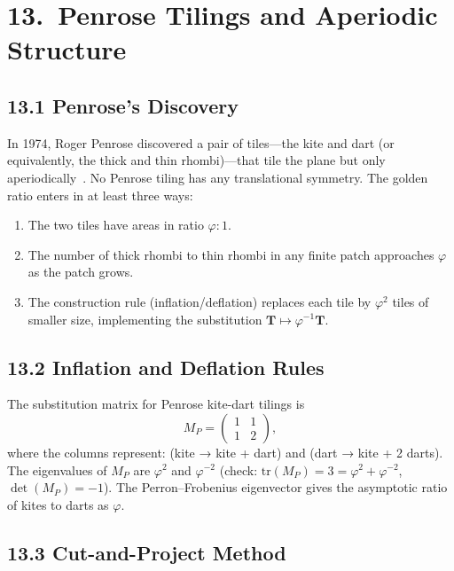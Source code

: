 \section{13.\ Penrose Tilings and Aperiodic Structure}
\label{sec:gc-penrose}

\subsection{13.1 Penrose's Discovery}
\label{subsec:gc-penrose-discovery}

In 1974, Roger Penrose discovered a pair of
tiles---the kite and dart (or equivalently, the
thick and thin rhombi)---that tile the plane but
only aperiodically~\cite{penrose1974}.
No Penrose tiling has any translational symmetry.
The golden ratio enters in at least three ways:
\begin{enumerate}
  \item The two tiles have areas in ratio $\varphi:1$.
  \item The number of thick rhombi to thin rhombi
        in any finite patch approaches $\varphi$ as
        the patch grows.
  \item The construction rule (inflation/deflation)
        replaces each tile by $\varphi^2$ tiles of
        smaller size, implementing the substitution
        $\mathbf{T} \mapsto \varphi^{-1}\mathbf{T}$.
\end{enumerate}

\subsection{13.2 Inflation and Deflation Rules}
\label{subsec:gc-penrose-inflation}

The substitution matrix for Penrose kite-dart tilings is
\[
  M_P = \begin{pmatrix} 1 & 1 \\ 1 & 2 \end{pmatrix},
\]
where the columns represent: (kite → kite + dart)
and (dart → kite + 2 darts).
The eigenvalues of $M_P$ are $\varphi^2$ and $\varphi^{-2}$
(check: $\mathrm{tr}(M_P) = 3 = \varphi^2 + \varphi^{-2}$,
$\det(M_P) = -1$).
The Perron--Frobenius eigenvector gives the
asymptotic ratio of kites to darts as $\varphi$.

\subsection{13.3 Cut-and-Project Method}
\label{subsec:gc-cut-project}


